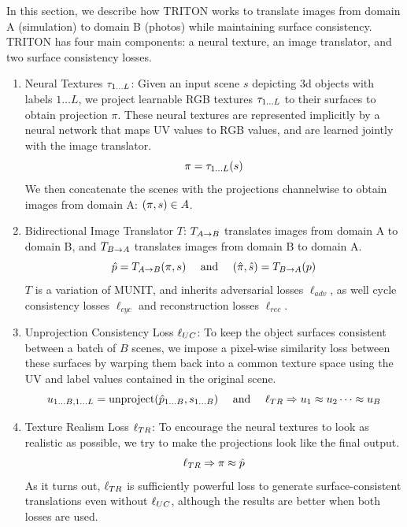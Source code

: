 \documentclass{article}
\begin{document}
	In this section, we describe how TRITON works to translate images from domain A (simulation) to domain B (photos) while maintaining surface consistency. 
	TRITON has four main components: a neural texture, an image translator, and two surface consistency losses.
	\begin{enumerate}
		\item{
			Neural Textures $\tau_{1\dots L}$: Given an input scene $s$ depicting 3d objects with labels $1\dots L$, we project learnable RGB textures $\tau_{1\dots L}$ to their surfaces to obtain projection $\pi$. 
			These neural textures are represented implicitly by a neural network that maps UV values to RGB values, and are learned jointly with the image translator.
			\begin{equation}
				\pi=\tau_{1\dots L}(s)
			\end{equation}
			We then concatenate the scenes with the projections channelwise to obtain images from domain A: $(\pi,s) \in A$.
		}
		\item{
			Bidirectional Image Translator $T$: $T_{A\rightarrow B}$ translates images from domain A to domain B, and $T_{B\rightarrow A}$ translates images from domain B to domain A.
			\begin{equation}
				\ph=\Tab(\pis)\ \ \ \text{ and }\ \ \ \ppish=\Tba(p)
			\end{equation}
			$T$ is a variation of MUNIT, and inherits adversarial losses $\ell_{adv}$, as well cycle consistency losses $\ell_{cyc}$ and reconstruction losses $\ell_{rec}$.
		}
		\item {
			Unprojection Consistency Loss $\ell_{UC}$: To keep the object surfaces consistent between a batch of $B$ scenes, we impose a pixel-wise similarity loss between these surfaces by warping them back into a common texture space using the UV and label values contained in the original scene. 
			\begin{equation}
				u\toBL=\text{unproject}(\ph\toB,s\toB)\ \ \ \text{ and } \ \ \ \lTR \Rightarrow u_1 \approx u_2 \dots \approx u_B
			\end{equation}
		}
		\item{
			Texture Realism Loss $\ell_{TR}$: To encourage the neural textures to look as realistic as possible, we try to make the projections look like the final output. 
			\begin{equation}
				\ell_{TR} \Rightarrow \pi \approx \hat{p}
			\end{equation}
			As it turns out, $\ell_{TR}$ is sufficiently powerful loss to generate surface-consistent translations even without $\ell_{UC}$, although the results are better when both losses are used.
		}
		
	\end{enumerate}
\end{document}
